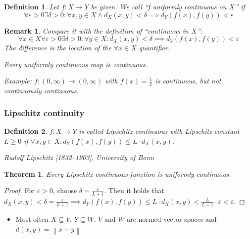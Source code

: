 \documentclass{article}
\newtheorem{theorem}{Theorem}  \numberwithin{theorem}{section}
\newtheorem{definition}{Definition}  \numberwithin{definition}{section}
\newtheorem{remark}{Remark}  \numberwithin{remark}{section}
\newcommand{\norm}[1]{\left\|#1\right\|}
\begin{document}
\begin{definition} %
  Let $f: X \to Y$ be given.
  We call \enquote{f uniformly continuous on $X$} if
  \[
  	\forall \varepsilon > 0 \exists \delta > 0:
  	\forall x, y \in X \land d_X(x,y) < \delta \implies d_Y(f(x), f(y)) < \varepsilon
  \]
\end{definition}

\begin{remark}
  Compare it with the definition of \enquote{continuous in $X$}:
  \[ \forall x \in X \forall \varepsilon > 0 \exists \delta > 0: \forall y \in X: d_X(x,y) < \delta \implies d_Y(f(x), f(y)) < \varepsilon \]
  The difference is the location of the $\forall x \in X$ quantifier.

  Every uniformly continuous map is continuous.

  Example: $f: (0, \infty) \to (0, \infty)$ with $f(x) = \frac1x$ is continuous, but not continuously continuous.
\end{remark}

\subsubsection{Lipschitz continuity}
\begin{definition} %
  $f: X \to Y$ is called \emph{Lipschitz continuous} with \emph{Lipschitz constant} $L \geq 0$ if $\forall x, y \in X: d_Y(f(x), f(y)) \leq L \cdot d_X(x,y)$.

  Rudolf Lipschitz [1832--1903], University of Bonn
\end{definition}

\begin{theorem}
  Every Lipschitz continuous function is uniformly continuous.
\end{theorem}
\begin{proof}
  For $\varepsilon > 0$, choose $\delta = \frac{\varepsilon}{L+1}$. Then it holds that
  $d_X(x,y) < \delta = \frac{\varepsilon}{L+1} \implies d_Y(f(x), f(y)) \leq L \cdot d_X(x,y) < \frac{L}{L+1} \cdot \varepsilon < \varepsilon$.
\end{proof}

\begin{itemize}
  \item Most often $X \subseteq V$, $Y \subseteq W$. $V$ and $W$ are normed vector spaces and $d(x, y) = \norm{x - y}$
\end{itemize}
\end{document}
